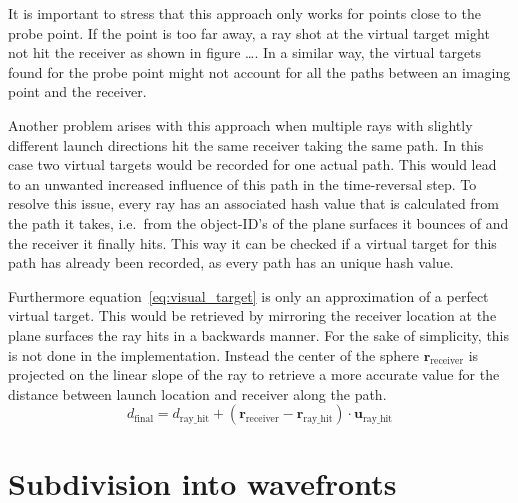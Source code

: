 It is important to stress that this approach only works for points close to the probe point.
If the point is too far away, a ray shot at the virtual target might not hit the receiver as shown in figure \ldots.
In a similar way, the virtual targets found for the probe point might not account for all the paths between an imaging point and the receiver.

Another problem arises with this approach when multiple rays with slightly different launch directions hit the same receiver taking the same path.
In this case two virtual targets would be recorded for one actual path.
This would lead to an unwanted increased influence of this path in the time-reversal step.
To resolve this issue, every ray has an associated hash value that is calculated from the path it takes, i.e.~from the object-ID's of the plane surfaces it bounces of and the receiver it finally hits.
This way it can be checked if a virtual target for this path has already been recorded, as every path has an unique hash value.

Furthermore equation~\eqref{eq:visual_target} is only an approximation of a perfect virtual target.
This would be retrieved by mirroring the receiver location at the plane surfaces the ray hits in a backwards manner.
For the sake of simplicity, this is not done in the implementation.
Instead the center of the sphere \(\mathbf{r}_{\text{receiver}}\) is projected on the linear slope of the ray to retrieve a more accurate value for the distance between launch location and receiver along the path.
\begin{equation}
    d_{\text{final}} = d_{\text{ray\_hit}} +  (\mathbf{r}_{\text{receiver}} - \mathbf{r}_{\text{ray\_hit}}) \cdot \mathbf{u}_{\text{ray\_hit}}
\end{equation}

\section{Subdivision into wavefronts}\label{section:subdivision_into_wavefronts}
